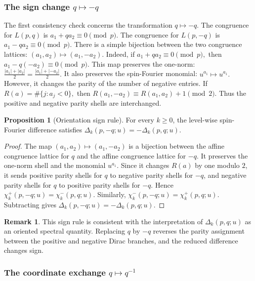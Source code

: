 \documentclass{article}
\theoremstyle{definition}
\newtheorem{proposition}[theorem]{Proposition}
\newtheorem{remark}[remark]{Remark}
\numberwithin{equation}{section}
\begin{document}
\subsubsection*{The sign change $q\mapsto -q$}

The first consistency check concerns the transformation $q\mapsto -q$.  The congruence for $L(p,q)$ is $a_1+q a_2\equiv0\pmod p.$ The congruence for $L(p,-q)$ is $a_1-q a_2\equiv0\pmod p.$ There is a simple bijection between the two congruence lattices: $(a_1,a_2)\longmapsto(a_1,-a_2).$ Indeed, if $a_1+q a_2\equiv0\pmod p,$ then $a_1-q(-a_2)\equiv0\pmod p.$ This map preserves the one-norm: $\frac{|a_1|+|a_2|}{2}=\frac{|a_1|+|-a_2|}{2}.$ It also preserves the spin-Fourier monomial: $u^{a_1}\longmapsto u^{a_1}.$ However, it changes the parity of the number of negative entries.  If $R(a)=\#\{j:a_j<0\},$ then $R(a_1,-a_2)\equiv R(a_1,a_2)+1\pmod2.$ Thus the positive and negative parity shells are interchanged.

\begin{proposition}[Orientation sign rule]
\label{prop:orientation-sign-rule-equivariant}
For every $k\geq0$, the level-wise spin-Fourier difference satisfies $\Delta_k(p,-q;u)=-\Delta_k(p,q;u).$ \end{proposition}

\begin{proof}
The map $(a_1,a_2)\longmapsto(a_1,-a_2)$ is a bijection between the affine congruence lattice for $q$ and the affine congruence lattice for $-q$.  It preserves the one-norm shell and the monomial $u^{a_1}$.  Since it changes $R(a)$ by one modulo $2$, it sends positive parity shells for $q$ to negative parity shells for $-q$, and negative parity shells for $q$ to positive parity shells for $-q$.  Hence $\chi_k^+(p,-q;u)=\chi_k^-(p,q;u).$ Similarly, $\chi_k^-(p,-q;u)=\chi_k^+(p,q;u).$ Subtracting gives $\Delta_k(p,-q;u)=-\Delta_k(p,q;u).$ \end{proof}

\begin{remark}
This sign rule is consistent with the interpretation of $\Delta_k(p,q;u)$ as an oriented spectral quantity.  Replacing $q$ by $-q$ reverses the parity assignment between the positive and negative Dirac branches, and the reduced difference changes sign.
\end{remark}

\subsubsection*{The coordinate exchange $q\mapsto q^{-1}$}
\end{document}
